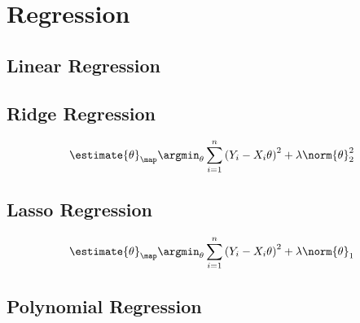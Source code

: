 \documentclass[18pt,a3paper,landscape, ncols=3]{cheatsheet}
\begin{document}
\clearpage		
		
\section{Regression} \seperator
	\subsection{Linear Regression}
		\begin{mdframed}
			\vspace{10mm}
		\end{mdframed}
		\begin{mdframed}
			\vspace{20mm}
		\end{mdframed}
	\subsection{Ridge Regression}
		\begin{mdframed}
			\[
				\estimate{\theta}_{\map}\argmin_{\theta} \sum_{i=1}^{n} {(Y_i - X_i \theta)}^2 + \lambda \norm{\theta}_{2}^{2}
			\]
		\end{mdframed}
		\begin{mdframed}
			\vspace{20mm}
		\end{mdframed}
	\subsection{Lasso Regression}
		\begin{mdframed}
			\[
				\estimate{\theta}_{\map}\argmin_{\theta} \sum_{i=1}^{n} {(Y_i - X_i \theta)}^2 + \lambda \norm{\theta}_{1}
			\]
		\end{mdframed}
		\begin{mdframed}
			\vspace{15mm}
		\end{mdframed}
	\subsection{Polynomial Regression}
		\begin{mdframed}
			\vspace{10mm}
		\end{mdframed}
		\begin{mdframed}
			\vspace{20mm}
		\end{mdframed}

\end{document}
